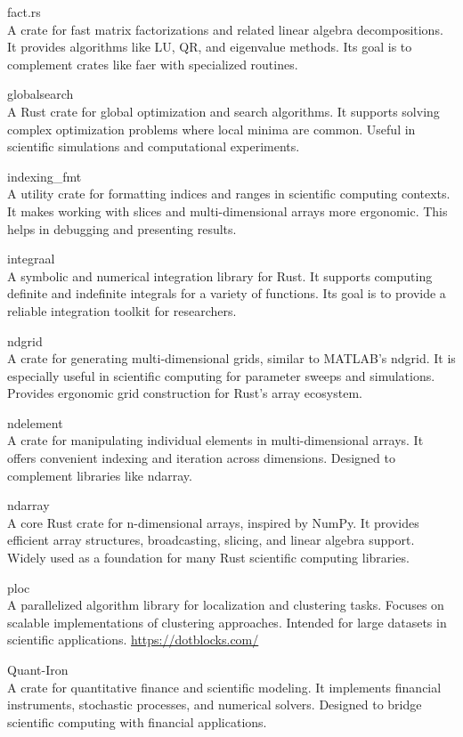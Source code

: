 \documentclass{article}
\begin{document}
fact.rs\\
A crate for fast matrix factorizations and related linear algebra decompositions. It
provides algorithms like LU, QR, and eigenvalue methods. Its goal is to complement crates like faer
with specialized routines.

globalsearch\\
A Rust crate for global optimization and search algorithms. It supports solving
complex optimization problems where local minima are common. Useful in scientific simulations and
computational experiments.

indexing\_fmt\\
A utility crate for formatting indices and ranges in scientific computing contexts.
It makes working with slices and multi-dimensional arrays more ergonomic. This helps in debugging
and presenting results.

integraal\\
A symbolic and numerical integration library for Rust. It supports computing definite
and indefinite integrals for a variety of functions. Its goal is to provide a reliable integration
toolkit for researchers.

ndgrid\\
A crate for generating multi-dimensional grids, similar to MATLAB’s ndgrid. It is
especially useful in scientific computing for parameter sweeps and simulations. Provides ergonomic
grid construction for Rust’s array ecosystem.

ndelement\\
A crate for manipulating individual elements in multi-dimensional arrays. It offers
convenient indexing and iteration across dimensions. Designed to complement libraries like ndarray.

ndarray\\
A core Rust crate for n-dimensional arrays, inspired by NumPy. It provides efficient
array structures, broadcasting, slicing, and linear algebra support. Widely used as a foundation
for many Rust scientific computing libraries.

ploc\\
A parallelized algorithm library for localization and clustering tasks. Focuses on scalable
implementations of clustering approaches. Intended for large datasets in scientific applications.
\url{https://dotblocks.com/}

Quant-Iron\\
A crate for quantitative finance and scientific modeling. It implements financial
instruments, stochastic processes, and numerical solvers. Designed to bridge scientific computing
with financial applications.
\end{document}
